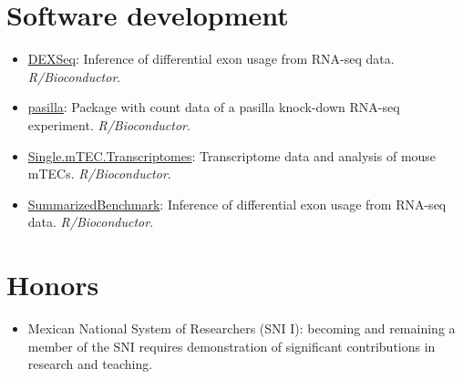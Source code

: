 \documentclass[11pt,a4paper,sans]{moderncv} %
\begin{document}
\section{Software development}
\vspace{-.1cm}
\begin{itemize}
\item \href{http://www.bioconductor.org/packages/release/bioc/html/DEXSeq.html}{DEXSeq}: Inference of differential exon usage from RNA-seq data. \textit{R/Bioconductor}.
\item \href{http://bioconductor.org/packages/release/data/experiment/html/pasilla.html}{pasilla}: Package with count data of a pasilla knock-down RNA-seq experiment. \textit{R/Bioconductor}.
\item \href{http://bioconductor.org/packages/release/data/experiment/html/Single.mTEC.Transcriptomes.html}{Single.mTEC.Transcriptomes}: Transcriptome data and analysis of mouse mTECs. \textit{R/Bioconductor}.
\item \href{http://www.bioconductor.org/packages/release/bioc/html/SummarizedBenchmark.html}{SummarizedBenchmark}: Inference of differential exon usage from RNA-seq data. \textit{R/Bioconductor}.
\end{itemize}
\vspace{-.2cm}

\section{Honors}
\begin{itemize}
\item Mexican National System of Researchers (SNI I): becoming and
  remaining a member of the SNI requires demonstration of significant contributions in
  research and teaching.\\
\end{itemize}
\end{document}
